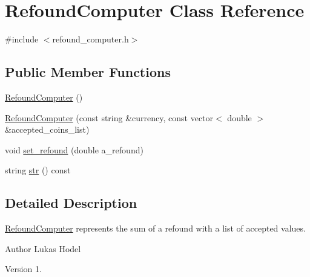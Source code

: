 \hypertarget{classRefoundComputer}{\section{Refound\-Computer Class Reference}
\label{classRefoundComputer}
}


{\ttfamily \#include $<$refound\-\_\-computer.\-h$>$}

\subsection*{Public Member Functions}
\begin{DoxyCompactItemize}
\item 
\hyperlink{classRefoundComputer_a48f52d711a12490074da778084fa9b19}{Refound\-Computer} ()
\item 
\hyperlink{classRefoundComputer_aacf86566e78253410eb02e577664789f}{Refound\-Computer} (const string \&currency, const vector$<$ double $>$ \&accepted\-\_\-coins\-\_\-list)
\item 
void \hyperlink{classRefoundComputer_a2ed7a4501d14097325c5575fa3c5eab7}{set\-\_\-refound} (double a\-\_\-refound)
\item 
string \hyperlink{classRefoundComputer_a94f386e9c403ffc5e47e50628be4731f}{str} () const 
\end{DoxyCompactItemize}


\subsection{Detailed Description}
\hyperlink{classRefoundComputer}{Refound\-Computer} represents the sum of a refound with a list of accepted values.

\begin{DoxyAuthor}{Author}
Lukas Hodel 
\end{DoxyAuthor}
\begin{DoxyVersion}{Version}
1. 
\end{DoxyVersion}



